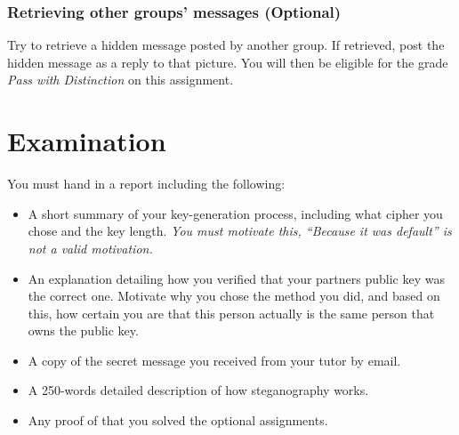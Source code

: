 \documentclass[a4paper]{llncs}
\begin{document}
\subsubsection{Retrieving other groups' messages (Optional)}
\label{subsec:Stegopt}
Try to retrieve a hidden message posted by another group.
If retrieved, post the hidden message as a reply to that picture.
You will then be eligible for the grade \emph{Pass with Distinction} on this 
assignment.

% 
%
%


\section{Examination}
\label{sec:Exam}
You must hand in a report including the following:
\begin{itemize}
  \item A short summary of your key-generation process, including what cipher 
    you chose and the key length.
    \emph{You must motivate this, ``Because it was default'' is not a valid 
    motivation.}
  \item An explanation detailing how you verified that your partners public key 
    was the correct one.
    Motivate why you chose the method you did, and based on this, how certain 
    you are that this person actually is the same person that owns the public 
    key.
  \item A copy of the secret message you received from your tutor by email.
  \item A 250-words detailed description of how steganography works.
  \item Any proof of that you solved the optional assignments.

\end{itemize}


\printbibliography{}
\end{document}
